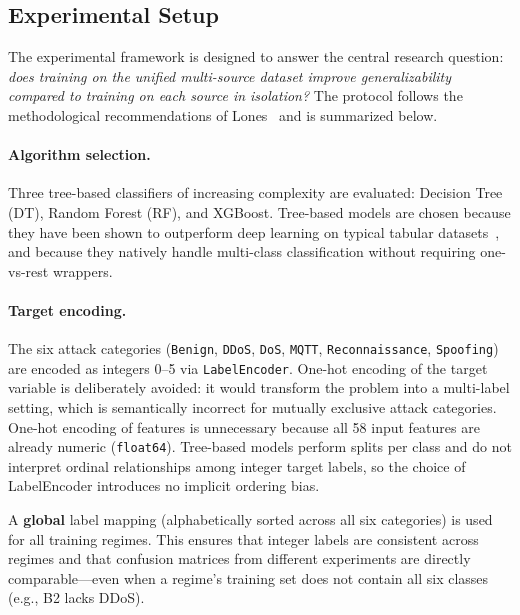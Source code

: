 \subsection{Experimental Setup}
\label{subsec:experimental-setup}

The experimental framework is designed to answer the central research question: \emph{does training on the unified multi-source dataset improve generalizability compared to training on each source in isolation?} The protocol follows the methodological recommendations of Lones~\cite{lones2024avoid} and is summarized below.

\paragraph{Algorithm selection.}
Three tree-based classifiers of increasing complexity are evaluated: Decision Tree (DT), Random Forest (RF), and XGBoost. Tree-based models are chosen because they have been shown to outperform deep learning on typical tabular datasets~\cite{grinsztajn2022tree}, and because they natively handle multi-class classification without requiring one-vs-rest wrappers.

\paragraph{Target encoding.}
The six attack categories (\texttt{Benign}, \texttt{DDoS}, \texttt{DoS}, \texttt{MQTT}, \texttt{Reconnaissance}, \texttt{Spoofing}) are encoded as integers 0--5 via \texttt{LabelEncoder}. One-hot encoding of the target variable is deliberately avoided: it would transform the problem into a multi-label setting, which is semantically incorrect for mutually exclusive attack categories. One-hot encoding of features is unnecessary because all 58 input features are already numeric (\texttt{float64}). Tree-based models perform splits per class and do not interpret ordinal relationships among integer target labels, so the choice of LabelEncoder introduces no implicit ordering bias.

A \textbf{global} label mapping (alphabetically sorted across all six categories) is used for all training regimes. This ensures that integer labels are consistent across regimes and that confusion matrices from different experiments are directly comparable---even when a regime's training set does not contain all six classes (e.g., B2 lacks DDoS).

